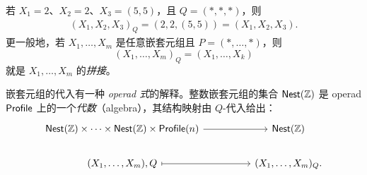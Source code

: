 \begin{example}\label{exampleofmultiplesubstitution1}
    若 $X_1 = 2$、$X_2 = 2$、$X_3 = (5,5)$，且 $Q = (*,*,*)$，则
    \begin{align*}
        (X_1,X_2,X_3)_Q = (2,2,(5,5)) = (X_1,X_2,X_3).
    \end{align*}
    更一般地，若 $X_1,\dots,X_m$ 是任意嵌套元组且 $P = (* , \dots , *)$，则
    \[
    (X_1,\dots,X_m)_Q = (X_1,\dots,X_k)
    \]
    就是 $X_1,\dots,X_m$ 的{\it 拼接}。
\end{example}

\begin{aside}
    嵌套元组的代入有一种 {\it operad 式}的解释。整数嵌套元组的集合 $\mathsf{Nest}(\mathbb{Z})$ 是 operad $\mathsf{Profile}$ 上的一个{\it 代数}（algebra），其结构映射由 $Q$-代入给出：
    \[ \begin{tikzcd}
    \mathterm{Nest}(\mathbb{Z})\times \dots \times \mathterm{Nest}(\mathbb{Z})\times \mathterm{Profile}(n) \ar[rr] & & \mathterm{Nest}(\mathbb{Z})\\
    (X_1,\dots,X_m),Q \ar[rr,mapsto] & & (X_1,\dots,X_m)_Q.
    \end{tikzcd}\]
\end{aside}





